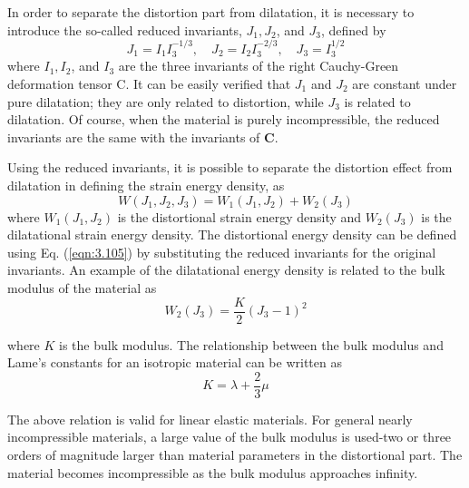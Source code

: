 In order to separate the distortion part from dilatation, it is necessary to introduce the so-called reduced invariants, $ J_{1}, J_{2} $, and $ J_{3} $, defined by
\begin{equation}
 J_{1}=I_{1} I_{3}^{-1 / 3}, \quad J_{2}=I_{2} I_{3}^{-2 / 3}, \quad J_{3}=I_{3}^{1 / 2} 
\end{equation}
where $ I_{1}, I_{2} $, and $ I_{3} $ are the three invariants of the right Cauchy-Green deformation tensor C. It can be easily verified that $ J_{1} $ and $ J_{2} $ are constant under pure dilatation; they are only related to distortion, while $ J_{3} $ is related to dilatation. Of course, when the material is purely incompressible, the reduced invariants are the same with the invariants of $ \mathbf{C} $.

Using the reduced invariants, it is possible to separate the distortion effect from dilatation in defining the strain energy density, as
\begin{equation}
 W\left(J_{1}, J_{2}, J_{3}\right)=W_{1}\left(J_{1}, J_{2}\right)+W_{2}\left(J_{3}\right) 
\end{equation}
where $ W_{1}\left(J_{1}, J_{2}\right) $ is the distortional strain energy density and $ W_{2}\left(J_{3}\right) $ is the dilatational strain energy density. The distortional energy density can be defined using Eq. (\ref{eqn:3.105}) by substituting the reduced invariants for the original invariants. An example of the dilatational energy density is related to the bulk modulus of the material as
\begin{equation}
W_{2}\left(J_{3}\right)=\frac{K}{2}\left(J_{3}-1\right)^{2}
\end{equation}

where $ K $ is the bulk modulus. The relationship between the bulk modulus and Lame's constants for an isotropic material can be written as
\begin{equation}
K=\lambda+\frac{2}{3} \mu
\end{equation}

The above relation is valid for linear elastic materials. For general nearly incompressible materials, a large value of the bulk modulus is used-two or three orders of magnitude larger than material parameters in the distortional part. The material becomes incompressible as the bulk modulus approaches infinity.
